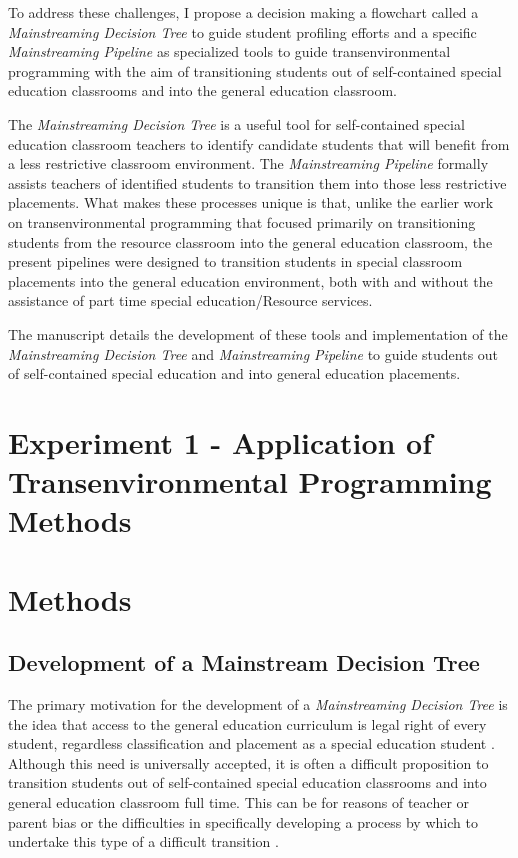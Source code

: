 \documentclass[twoside]{article}
\begin{document}
To address these challenges, I propose a decision making a flowchart called a \textit{Mainstreaming Decision Tree} to guide student profiling efforts and a specific \textit{Mainstreaming Pipeline} as specialized tools to guide transenvironmental programming with the aim of transitioning students out of self-contained special education classrooms and into the general education classroom. 

The \textit{Mainstreaming Decision Tree} is a useful tool for self-contained special education classroom teachers to identify candidate students that will benefit from a less restrictive classroom environment. The \textit{Mainstreaming Pipeline} formally assists teachers of identified students to transition them into those less restrictive placements. What makes these processes unique is that, unlike the earlier work on transenvironmental programming that focused primarily on transitioning students from the resource classroom into the general education classroom, the present pipelines were designed to transition students in special classroom placements into the general education environment, both with and without the assistance of part time special education/Resource services. 

The manuscript details the development of these tools and implementation of the \textit{Mainstreaming Decision Tree} and \textit{Mainstreaming Pipeline} to guide students out of self-contained special education and into general education placements.
\section{Experiment 1 - Application of Transenvironmental Programming Methods}
\section{Methods}
\subsection{Development of a Mainstream Decision Tree}
The primary motivation for the development of a \textit{Mainstreaming Decision Tree} is the idea that access to the general education curriculum is legal right of every student, regardless classification and placement as a special education student \parencite{hocutt1996effectiveness,johnson2005key,conway1988mainstreaming}. Although this need is universally accepted, it is often a difficult proposition to transition students out of self-contained special education classrooms and into general education classroom full time. This can be for reasons of teacher or parent bias \parencite{skiba2008achieving,marden2013criteria, smith2006classroom, praisner2003attitudes} or the difficulties in specifically developing a process by which to undertake this type of a difficult transition \parencite{cauley2006developing,fuchs1994classroom, kalaci2007students}.
\end{document}
